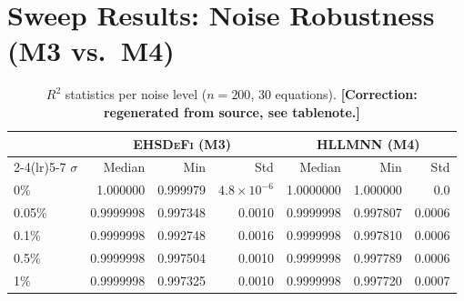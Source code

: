 \documentclass[twoside,11pt]{article}
\newcommand{\EHD}{\textsc{EHSDeFi}}
\newcommand{\HSL}{\textsc{HLLMNN}}
\newcommand{\Rsq}{R^{2}}
\begin{document}
\section{Sweep Results: Noise Robustness (M3 vs.\ M4)}
\label{sec:noise}

\begin{table}[H]
\centering
\caption{$\Rsq$ statistics per noise level ($n=200$, 30 equations).
\textbf{[Correction: regenerated from source, see tablenote.]}}
\label{tab:r2_noise}
\renewcommand{\arraystretch}{1.2}
\small
\begin{tabular}{l r r r r r r}
\toprule
& \multicolumn{3}{c}{\textcolor{m3blue}{\textbf{\EHD{} (M3)}}}
& \multicolumn{3}{c}{\textcolor{m4red}{\textbf{\HSL{} (M4)}}}\\
\cmidrule(lr){2-4}\cmidrule(lr){5-7}
$\sigma$ & Median & Min & Std & Median & Min & Std\\
\midrule
0\%    & 1.000000 & 0.999979 & $4.8\times10^{-6}$ & 1.0000000 & 1.000000 & $0.0$\\
0.05\% & 0.9999998 & 0.997348 & 0.0010 & 0.9999998 & 0.997807 & 0.0006\\
0.1\%  & 0.9999998 & 0.992748 & 0.0016 & 0.9999998 & 0.997810 & 0.0006\\
0.5\%  & 0.9999998 & 0.997504 & 0.0010 & 0.9999998 & 0.997789 & 0.0006\\
1\%    & 0.9999998 & 0.997325 & 0.0010 & 0.9999998 & 0.997720 & 0.0007\\
\bottomrule
\end{tabular}
\end{table}
\end{document}
